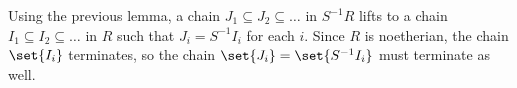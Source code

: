 Using the previous lemma, a chain
$J_1 \subseteq J_2 \subseteq \ldots$ in $S^{-1}R$ lifts to a chain
$I_1 \subseteq I_2 \subseteq \ldots$ in $R$ such that
$J_i = S^{-1}I_i$ for each $i$. Since $R$ is noetherian, the chain
$\set{I_i}$ terminates, so the chain $\set{J_i} = \set{S^{-1}I_i}$ must terminate
as well.
